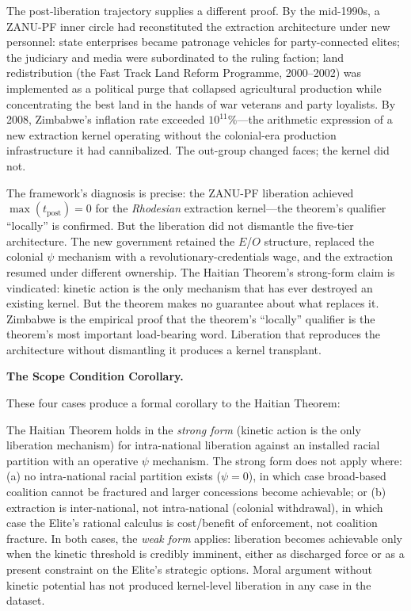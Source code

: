 The post-liberation trajectory supplies a different proof. By the mid-1990s, a ZANU-PF inner circle had reconstituted the extraction architecture under new personnel: state enterprises became patronage vehicles for party-connected elites; the judiciary and media were subordinated to the ruling faction; land redistribution (the Fast Track Land Reform Programme, 2000--2002) was implemented as a political purge that collapsed agricultural production while concentrating the best land in the hands of war veterans and party loyalists. By 2008, Zimbabwe's inflation rate exceeded $10^{11}$\%---the arithmetic expression of a new extraction kernel operating without the colonial-era production infrastructure it had cannibalized. The out-group changed faces; the kernel did not.

The framework's diagnosis is precise: the ZANU-PF liberation achieved $\max(t_{\text{post}}) = 0$ for the \textit{Rhodesian} extraction kernel---the theorem's qualifier ``locally'' is confirmed. But the liberation did not dismantle the five-tier architecture. The new government retained the $E$/$O$ structure, replaced the colonial $\psi$ mechanism with a revolutionary-credentials wage, and the extraction resumed under different ownership. The Haitian Theorem's strong-form claim is vindicated: kinetic action is the only mechanism that has ever destroyed an existing kernel. But the theorem makes no guarantee about what replaces it. Zimbabwe is the empirical proof that the theorem's ``locally'' qualifier is the theorem's most important load-bearing word. Liberation that reproduces the architecture without dismantling it produces a kernel transplant.

\textbf{The Scope Condition Corollary.}

These four cases produce a formal corollary to the Haitian Theorem:

\begin{definition}
The Haitian Theorem holds in the \textit{strong form} (kinetic action is the only liberation mechanism) for intra-national liberation against an installed racial partition with an operative $\psi$ mechanism. The strong form does not apply where: (a) no intra-national racial partition exists ($\psi = 0$), in which case broad-based coalition cannot be fractured and larger concessions become achievable; or (b) extraction is inter-national, not intra-national (colonial withdrawal), in which case the Elite's rational calculus is cost/benefit of enforcement, not coalition fracture. In both cases, the \textit{weak form} applies: liberation becomes achievable only when the kinetic threshold is credibly imminent, either as discharged force or as a present constraint on the Elite's strategic options. Moral argument without kinetic potential has not produced kernel-level liberation in any case in the dataset.
\end{definition}

